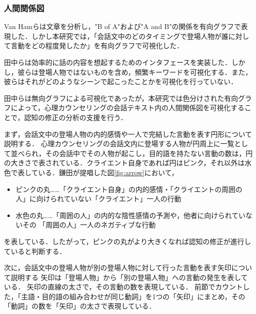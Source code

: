 \documentclass[shuuron]{kuee}
\begin{document}
\subsubsection{人間関係図}

Van Hamら\cite{van2009mapping}は文章を分析し，"B of A"および"A and B"の関係を有向グラフで表現した．しかし本研究では，「会話文中のどのタイミングで登場人物が誰に対して言動をどの程度発したか」を有向グラフで可視化した．

田中ら\cite{tanaka}は効率的に話の内容を想起するためのインタフェースを実装した．しかし，彼らは登場人物ではないものを含め，頻繁キーワードを可視化する．また，彼らはそれがどのようなシーンで起こったことかを可視化を行っていない．

田中らは無向グラフによる可視化であったが，本研究では色分けされた有向グラフによって，心理カウンセリングの会話テキスト内の人間関係図を可視化することで，認知の修正の分析の支援を行う．


まず，会話文中の登場人物の内的感情や一人で完結した言動を表す円形について説明する．
心理カウンセリングの会話文内に登場する人物が円周上に一覧として並べられ，その会話中でその人物が起こし，目的語を持たない言動の数は，円の大きさで表されている．クライエント自身であれば円はピンク，それ以外は水色で表している．鎌田\cite{鎌田穣2002臨床}が提唱した図\ref{fig:arrow}において，
\begin{itemize}
  \item ピンクの丸……「クライエント自身」の内的感情・「クライエントの周囲の人」に向けられていない「クライエント」一人の行動
  \item 水色の丸……「周囲の人」の内的な陰性感情の予測や，他者に向けられていないその
  「周囲の人」一人のネガティブな行動
\end{itemize}
を表している．したがって，ピンクの丸がより大きくなれば認知の修正が進行していると判断する．

次に，会話文中の登場人物が別の登場人物に対して行った言動を表す矢印について説明する
矢印は「登場人物」から「別の登場人物」への言動の発生を表している．
矢印の直線の太さで，その言動の数を表現している．
前節でカウントした，「主語・目的語の組み合わせが同じ動詞」を1つの「矢印」にまとめ，その「動詞」の数を「矢印」の太さで表現している．
\end{document}
